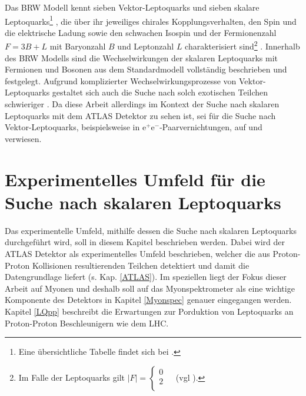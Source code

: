 Das BRW Modell kennt sieben Vektor-Leptoquarks und sieben skalare Leptoquarks\footnote{Eine übersichtliche Tabelle findet sich bei \cite[S. 11]{Kuze}.} \cite{LMU_DR}, die über ihr jeweiliges chirales Kopplungsverhalten, den Spin und die elektrische Ladung sowie den schwachen Isospin und der Fermionenzahl \(F=3B+L\) mit Baryonzahl \(B\) und Leptonzahl \(L\) charakterisiert sind\footnote{Im Falle der Leptoquarks gilt \(|F|=\begin{cases}0&\\2&\\\end{cases}\) (vgl \cite{Kuze}).} \cite{Minireview}. Innerhalb des BRW Modells sind die Wechselwirkungen der skalaren Leptoquarks mit Fermionen und Bosonen aus dem Standardmodell vollständig beschrieben und festgelegt. Aufgrund komplizierter Wechselwirkungsprozesse von Vektor-Leptoquarks gestaltet sich auch die Suche nach solch exotischen Teilchen schwieriger \cite{Kuze}. Da diese Arbeit allerdings im Kontext der Suche nach skalaren Leptoquarks mit dem ATLAS Detektor zu sehen ist, sei für die Suche nach Vektor-Leptoquarks, beispielsweise in \(\text{e}^{+}\text{e}^{-}\)-Paarvernichtungen, auf \cite{vectorLQ} und \cite{vectorLQQ} verwiesen.
%
%
%
\chapter{Experimentelles Umfeld für die Suche nach skalaren Leptoquarks}%
Das experimentelle Umfeld, mithilfe dessen die Suche nach skalaren Leptoquarks durchgeführt wird, soll in diesem Kapitel beschrieben werden. Dabei wird der \mbox{ATLAS} Detektor als experimentelles Umfeld beschrieben, welcher die aus Proton-Proton Kollisionen resultierenden Teilchen detektiert und damit die Datengrundlage liefert (s. Kap. \ref{ATLAS}). Im speziellen liegt der Fokus dieser Arbeit auf Myonen und des\-halb soll auf das Myonspektrometer als eine wichtige Komponente des Detektors in Kapitel \ref{Myonspec} genauer eingegangen werden. Kapitel \ref{LQpp} beschreibt die Erwartungen zur Porduktion von Leptoquarks an Proton-Proton Beschleunigern wie dem LHC.
